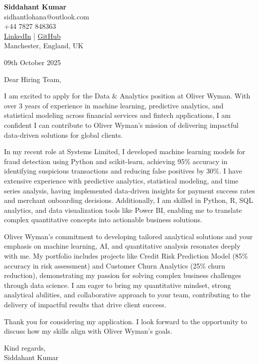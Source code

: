 \documentclass[letterpaper,11pt]{article}
\begin{document}
\begin{center}
\textbf{Siddahant Kumar} \\
sidhantlohana@outlook.com \\
+44 7827 848363 \\
\href{https://www.linkedin.com/in/siddahantkumar/}{LinkedIn} | \href{https://github.com/siddahantKumar}{GitHub} \\
Manchester, England, UK \\
\end{center}

\begin{flushright}
09th October 2025
\end{flushright}

\begin{flushleft}
Dear Hiring Team,
\end{flushleft}

I am excited to apply for the Data \& Analytics position at Oliver Wyman. With over 3 years of experience in machine learning, predictive analytics, and statistical modeling across financial services and fintech applications, I am confident I can contribute to Oliver Wyman's mission of delivering impactful data-driven solutions for global clients.

In my recent role at Systems Limited, I developed machine learning models for fraud detection using Python and scikit-learn, achieving 95\% accuracy in identifying suspicious transactions and reducing false positives by 30\%. I have extensive experience with predictive analytics, statistical modeling, and time series analysis, having implemented data-driven insights for payment success rates and merchant onboarding decisions. Additionally, I am skilled in Python, R, SQL analytics, and data visualization tools like Power BI, enabling me to translate complex quantitative concepts into actionable business solutions.

Oliver Wyman's commitment to developing tailored analytical solutions and your emphasis on machine learning, AI, and quantitative analysis resonates deeply with me. My portfolio includes projects like Credit Risk Prediction Model (85\% accuracy in risk assessment) and Customer Churn Analytics (25\% churn reduction), demonstrating my passion for solving complex business challenges through data science. I am eager to bring my quantitative mindset, strong analytical abilities, and collaborative approach to your team, contributing to the delivery of impactful results that drive client success.

Thank you for considering my application. I look forward to the opportunity to discuss how my skills align with Oliver Wyman's goals.

\begin{flushleft}
Kind regards, \\
Siddahant Kumar
\end{flushleft}
\end{document}
